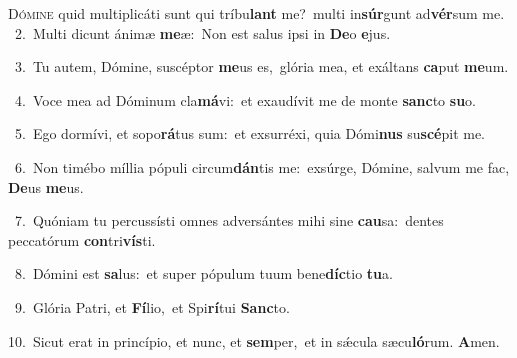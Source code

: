 \lettrine{\initial\textcolor{\initialcolor}{D}}{ómine} quid multiplicáti sunt qui tríbu\textbf{lant} me?~\star multi in\-\textbf{súr}\-gunt ad\-\textbf{vér}\-sum me.\\
{\numbfont\textcolor{\numbcolor}{~2.}}~Multi dicunt ánimæ \textbf{me}\-æ:~\star Non est salus ipsi in \textbf{De}\-o \textbf{e}\-jus.\par
{\numbfont\textcolor{\numbcolor}{~3.}}~Tu autem, Dómine, suscéptor \textbf{me}\-us es,~\star glória mea, et exáltans \textbf{ca}\-put \textbf{me}\-um.\par
{\numbfont\textcolor{\numbcolor}{~4.}}~Voce mea ad Dóminum cla\-\textbf{má}\-vi:~\star et exaudívit me de monte \textbf{sanc}\-to \textbf{su}\-o.\par
{\numbfont\textcolor{\numbcolor}{~5.}}~Ego dormívi, et sopo\-\textbf{rá}\-tus sum:~\star et exsurréxi, quia Dómi\textbf{nus} su\-\textbf{scé}\-pit me.\par
{\numbfont\textcolor{\numbcolor}{~6.}}~Non timébo míllia pópuli circum\-\textbf{dán}\-tis me:~\star exsúrge, Dómine, salvum me fac, \textbf{De}\-us \textbf{me}\-us.\par
{\numbfont\textcolor{\numbcolor}{~7.}}~Quóniam tu percussísti omnes adversántes mihi sine \textbf{cau}\-sa:~\star dentes peccatórum \textbf{con}\-tri\-\textbf{vís}\-ti.\par
{\numbfont\textcolor{\numbcolor}{~8.}}~Dómini est \textbf{sa}\-lus:~\star et super pópulum tuum bene\-\textbf{díc}\-tio \textbf{tu}\-a.\par
{\numbfont\textcolor{\numbcolor}{~9.}}~Glória Patri, et \textbf{Fí}\-lio,~\star et Spi\-\textbf{rí}\-tui \textbf{Sanc}\-to.\par
{\numbfont\textcolor{\numbcolor}{10.}}~Sicut erat in princípio, et nunc, et \textbf{sem}\-per,~\star et in sǽcula sæcu\-\textbf{ló}\-rum. \textbf{A}\-men.\par

